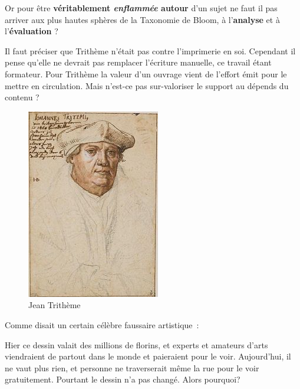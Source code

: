 \begin{minipage}[H]{0.54\linewidth}
Or pour être \textbf{véritablement \emph{enflammée} autour }d'un sujet ne faut il pas arriver aux plus hautes sphères de la Taxonomie de Bloom, à l'\textbf{analyse} et à l'\textbf{évaluation} ?

Il faut préciser que Trithème n'était pas contre l'imprimerie en soi. Cependant il pense qu'elle ne devrait pas remplacer l'écriture manuelle, ce travail étant formateur\cite{abbot-trithemius}. Pour Trithème la valeur d'un ouvrage vient de l'effort émit pour le mettre en circulation. Mais n'est-ce pas sur-valoriser le support au dépends du contenu ?
\vspace{1cm}
\end{minipage}
\begin{minipage}[H]{0.44\linewidth}
  \begin{figure}[H]
  \centering
  \includegraphics[height=0.15\paperheight]{../resources/illustrations/trithemius}
  \caption{Jean Trithème}
  \end{figure}
\end{minipage}

Comme disait un certain célèbre faussaire artistique~: 

\begin{coolquote}
Hier ce dessin valait des millions de florins, et experts et amateurs d'arts viendraient de partout dans le monde et paieraient pour le voir. Aujourd'hui, il ne vaut plus rien, et personne ne traverserait même la rue pour le voir gratuitement. Pourtant le dessin n'a pas changé. Alors pourquoi?
\end{coolquote}

